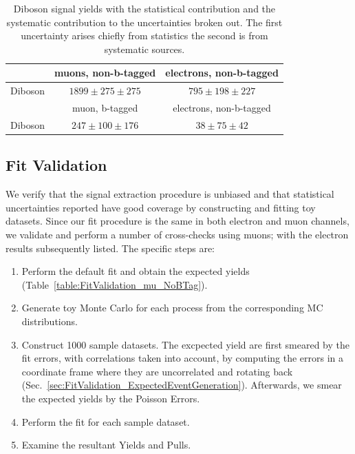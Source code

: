\begin{table}[bthp]
\begin{center}
\caption{\label{tab:dibosonYield} Diboson signal yields with the statistical contribution and the systematic contribution to the uncertainties broken out.  The first uncertainty arises chiefly from statistics the second is from systematic sources.}
\begin{tabular}{rcc}
\hline\hline
& muons, non-b-tagged & electrons, non-b-tagged \\
\hline
Diboson & $1899 \pm 275 \pm 275$ & $795 \pm 198 \pm 227$ \\
\hline
& muon, b-tagged & electrons, non-b-tagged \\
\hline
Diboson & $247 \pm 100 \pm 176$ & $38 \pm 75 \pm 42$ \\
\hline\hline
\end{tabular}
\end{center}
\end{table}


\clearpage
\subsection{Fit Validation}

We verify that the signal extraction procedure is unbiased and that 
statistical uncertainties reported have good coverage by constructing
and fitting toy datasets. Since our fit procedure is the same in both
electron and muon channels, we validate and perform a number of cross-checks
using muons; with the electron results subsequently listed. 
The specific steps are:
\begin{enumerate}
\item Perform the default fit and obtain the expected yields 
(Table~\ref{table:FitValidation_mu_NoBTag}).
\item Generate toy Monte Carlo for each process from the corresponding MC distributions.
\item Construct 1000 sample datasets. The excpected yield are first smeared by the fit 
errors, with correlations taken into account, by computing the errors in a coordinate frame 
where they are uncorrelated and rotating back (Sec.~\ref{sec:FitValidation_ExpectedEventGeneration}). 
Afterwards, we smear the expected yields by the Poisson Errors.
\item Perform the fit for each sample dataset.
\item Examine the resultant Yields and Pulls.
\end{enumerate}


